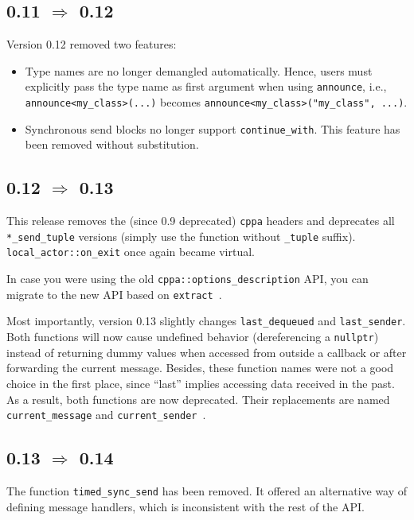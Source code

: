 \subsection{0.11 $\Rightarrow$ 0.12}

Version 0.12 removed two features:

\begin{itemize}
\item
Type names are no longer demangled automatically.
Hence, users must explicitly pass the type name as first argument when using \lstinline^announce^, i.e., \lstinline^announce<my_class>(...)^ becomes \lstinline^announce<my_class>("my_class", ...)^.

\item
Synchronous send blocks no longer support \lstinline^continue_with^.
This feature has been removed without substitution.
\end{itemize}

\subsection{0.12 $\Rightarrow$ 0.13}

This release removes the (since 0.9 deprecated) \lstinline^cppa^ headers and deprecates all \lstinline^*_send_tuple^ versions (simply use the function without \lstinline^_tuple^ suffix). \lstinline^local_actor::on_exit^ once again became virtual.

In case you were using the old \lstinline^cppa::options_description^ API, you can migrate to the new API based on \lstinline^extract^~.

Most importantly, version 0.13 slightly changes \lstinline^last_dequeued^ and \lstinline^last_sender^.
Both functions will now cause undefined behavior (dereferencing a \lstinline^nullptr^) instead of returning dummy values when accessed from outside a callback or after forwarding the current message.
Besides, these function names were not a good choice in the first place, since ``last'' implies accessing data received in the past.
As a result, both functions are now deprecated.
Their replacements are named \lstinline^current_message^ and \lstinline^current_sender^~.

\subsection{0.13 $\Rightarrow$ 0.14}

The function \lstinline^timed_sync_send^ has been removed. It offered an alternative way of defining message handlers, which is inconsistent with the rest of the API.


